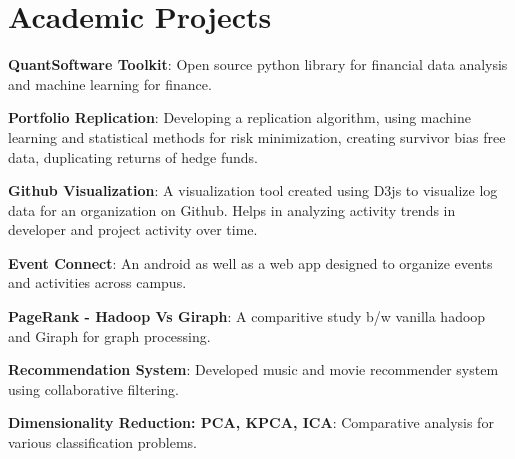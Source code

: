 \documentclass[letterpaper,11pt]{article}
\newcommand{\reslistitem}[1]{\small{\item #1 \vspace{-6pt}}}
\begin{document}
\section{Academic Projects}
    \begin{itemize}
          \reslistitem{\textbf{QuantSoftware Toolkit}: Open source python library for financial data analysis and machine learning for finance.}
	 \reslistitem{\textbf{Portfolio Replication}: Developing a replication algorithm, using machine learning and statistical methods for risk minimization, creating survivor bias free data, duplicating returns of hedge funds.}
	\reslistitem{\textbf{Github Visualization}: A visualization tool created using D3js to visualize log data for an organization on Github. Helps in analyzing activity trends in developer and project activity over time.}
	\reslistitem{\textbf{Event Connect}: An android as well as a web app designed to organize events and activities across campus.  }
	\reslistitem{\textbf{PageRank - Hadoop Vs Giraph}: A comparitive study b/w vanilla hadoop and Giraph for graph processing. }
	\reslistitem{\textbf{Recommendation System}: Developed music and movie recommender system using collaborative filtering.}
	\reslistitem{\textbf{Dimensionality Reduction: PCA, KPCA, ICA}: Comparative analysis for various classification problems.}
    \end{itemize}

\end{document}
